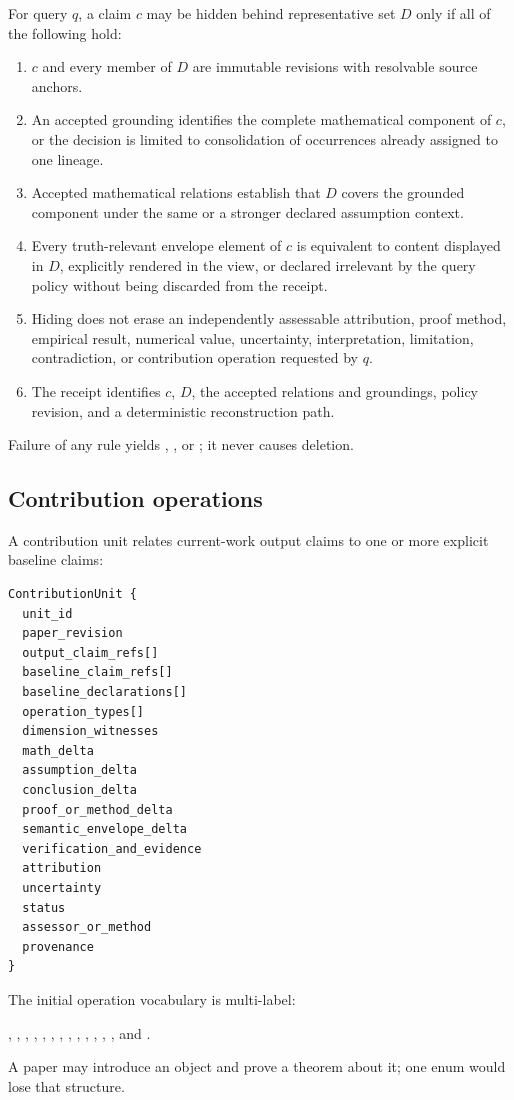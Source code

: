 For query $q$, a claim $c$ may be hidden behind representative set $D$ only if all of the following hold:
\begin{enumerate}[label=R\arabic*.]
  \item $c$ and every member of $D$ are immutable revisions with resolvable source anchors.
  \item An accepted grounding identifies the complete mathematical component of $c$, or the decision is limited to consolidation of occurrences already assigned to one lineage.
  \item Accepted mathematical relations establish that $D$ covers the grounded component under the same or a stronger declared assumption context.
  \item Every truth-relevant envelope element of $c$ is equivalent to content displayed in $D$, explicitly rendered in the view, or declared irrelevant by the query policy without being discarded from the receipt.
  \item Hiding does not erase an independently assessable attribution, proof method, empirical result, numerical value, uncertainty, interpretation, limitation, contradiction, or contribution operation requested by $q$.
  \item The receipt identifies $c$, $D$, the accepted relations and groundings, policy revision, and a deterministic reconstruction path.
\end{enumerate}
Failure of any rule yields , , or ; it never causes deletion.

\subsection{Contribution operations}

A contribution unit relates current-work output claims to one or more explicit baseline claims:
\begin{lstlisting}[style=interface]
ContributionUnit {
  unit_id
  paper_revision
  output_claim_refs[]
  baseline_claim_refs[]
  baseline_declarations[]
  operation_types[]
  dimension_witnesses
  math_delta
  assumption_delta
  conclusion_delta
  proof_or_method_delta
  semantic_envelope_delta
  verification_and_evidence
  attribution
  uncertainty
  status
  assessor_or_method
  provenance
}
\end{lstlisting}

The initial operation vocabulary is multi-label:
\begin{center}
, , , , ,
, , , , ,
, , , and .
\end{center}
A paper may introduce an object and prove a theorem about it; one enum would lose that structure.

